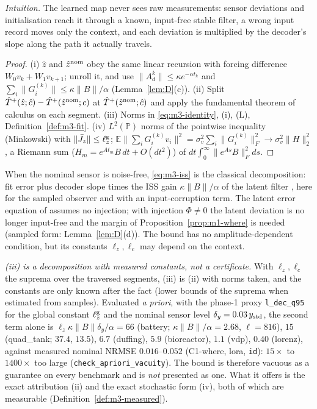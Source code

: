 \emph{Intuition.} The learned map never sees raw measurements: sensor deviations and
initialisation reach it through a known, input-free stable filter, a wrong input record moves
only the context, and each deviation is multiplied by the decoder's slope along the path it
actually travels.

\begin{proof}
(i) $\hat z$ and $\hat z^{\rm nom}$ obey the same linear recursion with forcing difference
$W_0v_k+W_1v_{k+1}$; unroll it, and use $\|A_d^k\|\le\kappa e^{-\alpha t_k}$ and
$\sum_i\|G^{(k)}_i\|\le\kappa\|B\|/\alpha$ (Lemma~\ref{lem:D}(c)). (ii) Split
$\hat T^{+}(\hat z;\hat c)-\hat T^{+}(\hat z^{\rm nom};c)$ at $\hat T^{+}(\hat z^{\rm nom};\hat c)$ and apply the
fundamental theorem of calculus on each segment. (iii) Norms in \eqref{eq:m3-identity}, (i), (L),
Definition~\ref{def:m3-fit}. (iv) $L^2(\mathbb P)$ norms of the pointwise inequality (Minkowski) with
$\|\bar J_z\|\le\ell^{\rm g}_z$; $\mathbb E\|\sum_iG^{(k)}_iv_i\|^2=\sigma_v^2\sum_i\|G^{(k)}_i\|_F^2\to\sigma_v^2\|H\|_2^2$,
a Riemann sum ($H_m=e^{At_m}B\,dt+O(dt^2)$) of $dt\int_0^\infty\|e^{As}B\|_F^2ds$.
\end{proof}

When the nominal sensor is noise-free, \eqref{eq:m3-iss} is the classical decomposition: fit
error plus decoder slope times the ISS gain $\kappa\|B\|/\alpha$ of the latent filter
\citep[cf.][Lemma~17, Theorem~19]{niazi2025kkl}, here for the sampled observer and with an
input-corruption term. The latent error equation of \citet[Proposition~1]{shaaban2026hyperkkl}
assumes no injection; with injection $\Phi\neq0$ the latent deviation is no longer input-free and
the margin of Proposition~\ref{prop:m1-where} is needed (sampled form: Lemma~\ref{lem:D}(d)).
The bound has no amplitude-dependent condition, but its constants $\ell_z,\ell_c$ may depend on the
context.

\emph{(iii) is a decomposition with measured constants, not a certificate.} With $\ell_z,\ell_c$ the suprema over the
traversed segments, (iii) is (ii) with norms taken, and the constants are only known after the fact (lower bounds of the
suprema when estimated from samples). Evaluated \emph{a priori}, with the phase-1 proxy \texttt{l\_dec\_q95} for the global
constant $\ell^{\rm g}_z$ and the nominal sensor level $\delta_y=0.03\,y_{\rm std}$, the second term alone is
$\ell_z\kappa\|B\|\delta_y/\alpha=66$ (battery; $\kappa\|B\|/\alpha=2.68$, $\ell=816$), $15$ (quad\_tank; $37.4$, $13.5$),
$6.7$ (duffing), $5.9$ (bioreactor), $1.1$ (vdp), $0.40$ (lorenz), against measured nominal NRMSE $0.016$--$0.052$
(C1-where, lora, \texttt{id}): $15\times$ to $1400\times$ too large (\texttt{check\_apriori\_vacuity}). The bound is therefore
vacuous as a guarantee on every benchmark and is \emph{not} presented as one. What it offers is the exact attribution
(ii) and the exact stochastic form (iv), both of which are measurable (Definition~\ref{def:m3-measured}).

